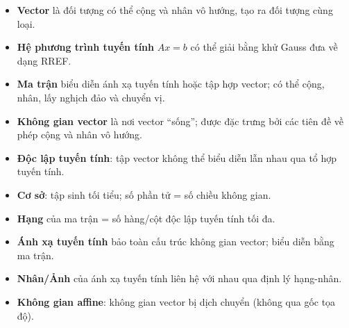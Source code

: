 \documentclass[12pt,a4paper]{article}
\begin{document}
\begin{tomtat}
\begin{itemize}
  \item \textbf{Vector} là đối tượng có thể cộng và nhân vô hướng, tạo ra đối tượng cùng loại.
  \item \textbf{Hệ phương trình tuyến tính} $Ax = b$ có thể giải bằng khử Gauss đưa về dạng RREF.
  \item \textbf{Ma trận} biểu diễn ánh xạ tuyến tính hoặc tập hợp vector; có thể cộng, nhân, lấy nghịch đảo và chuyển vị.
  \item \textbf{Không gian vector} là nơi vector ``sống''; được đặc trưng bởi các tiên đề về phép cộng và nhân vô hướng.
  \item \textbf{Độc lập tuyến tính}: tập vector không thể biểu diễn lẫn nhau qua tổ hợp tuyến tính.
  \item \textbf{Cơ sở}: tập sinh tối tiểu; số phần tử = số chiều không gian.
  \item \textbf{Hạng} của ma trận = số hàng/cột độc lập tuyến tính tối đa.
  \item \textbf{Ánh xạ tuyến tính} bảo toàn cấu trúc không gian vector; biểu diễn bằng ma trận.
  \item \textbf{Nhân/Ảnh} của ánh xạ tuyến tính liên hệ với nhau qua định lý hạng-nhân.
  \item \textbf{Không gian affine}: không gian vector bị dịch chuyển (không qua gốc tọa độ).
\end{itemize}
\end{tomtat}
\end{document}
